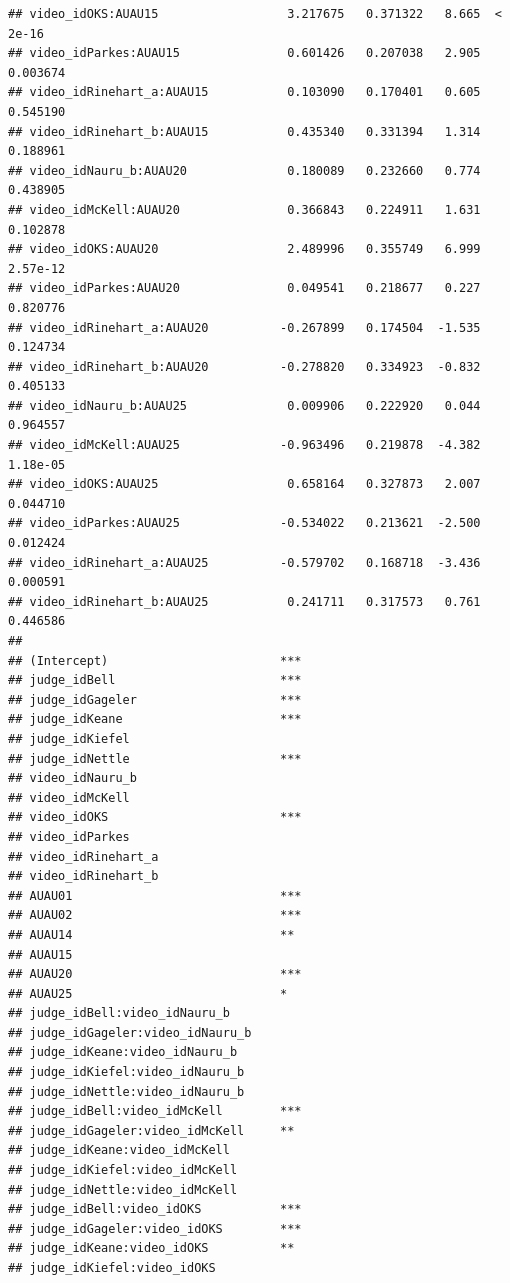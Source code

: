 \documentclass{monashthesis}
\begin{document}
\begin{verbatim}
## video_idOKS:AUAU15                  3.217675   0.371322   8.665  < 2e-16
## video_idParkes:AUAU15               0.601426   0.207038   2.905 0.003674
## video_idRinehart_a:AUAU15           0.103090   0.170401   0.605 0.545190
## video_idRinehart_b:AUAU15           0.435340   0.331394   1.314 0.188961
## video_idNauru_b:AUAU20              0.180089   0.232660   0.774 0.438905
## video_idMcKell:AUAU20               0.366843   0.224911   1.631 0.102878
## video_idOKS:AUAU20                  2.489996   0.355749   6.999 2.57e-12
## video_idParkes:AUAU20               0.049541   0.218677   0.227 0.820776
## video_idRinehart_a:AUAU20          -0.267899   0.174504  -1.535 0.124734
## video_idRinehart_b:AUAU20          -0.278820   0.334923  -0.832 0.405133
## video_idNauru_b:AUAU25              0.009906   0.222920   0.044 0.964557
## video_idMcKell:AUAU25              -0.963496   0.219878  -4.382 1.18e-05
## video_idOKS:AUAU25                  0.658164   0.327873   2.007 0.044710
## video_idParkes:AUAU25              -0.534022   0.213621  -2.500 0.012424
## video_idRinehart_a:AUAU25          -0.579702   0.168718  -3.436 0.000591
## video_idRinehart_b:AUAU25           0.241711   0.317573   0.761 0.446586
##                                       
## (Intercept)                        ***
## judge_idBell                       ***
## judge_idGageler                    ***
## judge_idKeane                      ***
## judge_idKiefel                        
## judge_idNettle                     ***
## video_idNauru_b                       
## video_idMcKell                        
## video_idOKS                        ***
## video_idParkes                        
## video_idRinehart_a                    
## video_idRinehart_b                    
## AUAU01                             ***
## AUAU02                             ***
## AUAU14                             ** 
## AUAU15                                
## AUAU20                             ***
## AUAU25                             *  
## judge_idBell:video_idNauru_b          
## judge_idGageler:video_idNauru_b       
## judge_idKeane:video_idNauru_b         
## judge_idKiefel:video_idNauru_b        
## judge_idNettle:video_idNauru_b        
## judge_idBell:video_idMcKell        ***
## judge_idGageler:video_idMcKell     ** 
## judge_idKeane:video_idMcKell          
## judge_idKiefel:video_idMcKell         
## judge_idNettle:video_idMcKell         
## judge_idBell:video_idOKS           ***
## judge_idGageler:video_idOKS        ***
## judge_idKeane:video_idOKS          ** 
## judge_idKiefel:video_idOKS            

\end{verbatim}
\end{document}
